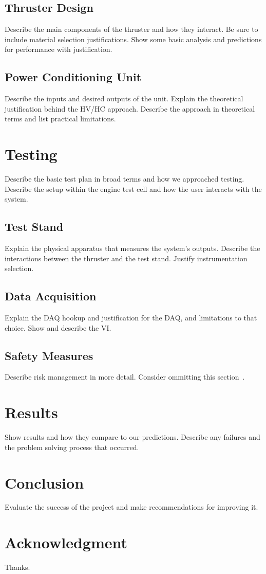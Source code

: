 \documentclass[journal]{IEEEtran}
\begin{document}
\subsection{Thruster Design}
Describe the main components of the thruster and how they interact. Be sure to include material selection justifications. Show some basic analysis and predictions for performance with justification.

\subsection{Power Conditioning Unit}
Describe the inputs and desired outputs of the unit. Explain the theoretical justification behind the HV/HC approach. Describe the approach in theoretical terms and list practical limitations.

\section{Testing}
Describe the basic test plan in broad terms and how we approached testing. Describe the setup within the engine test cell and how the user interacts with the system.

\subsection{Test Stand}
Explain the physical apparatus that measures the system's outputs. Describe the interactions between the thruster and the test stand. Justify instrumentation selection.

\subsection{Data Acquisition}
Explain the DAQ hookup and justification for the DAQ, and limitations to that choice. Show and describe the VI\@.

\subsection{Safety Measures}
Describe risk management in more detail. Consider ommitting this section~\cite{linden}.

\section{Results}
Show results and how they compare to our predictions. Describe any failures and the problem solving process that occurred.

\section{Conclusion}
Evaluate the success of the project and make recommendations for improving it.

\section*{Acknowledgment}
Thanks.



\end{document}
